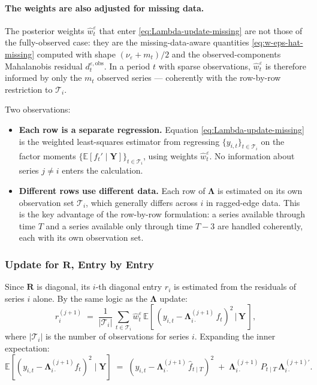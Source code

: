 \documentclass[11pt, a4paper, oneside]{article}
\newcommand{\mL}{\boldsymbol{\Lambda}}
\begin{document}
\paragraph{The weights are also adjusted for missing data.}
The posterior weights $\hat{w}^\varepsilon_t$ that enter
\eqref{eq:Lambda-update-missing} are not those of the fully-observed
case: they are the missing-data-aware quantities
\eqref{eq:w-eps-hat-missing} computed with shape $(\nu_\varepsilon + m_t)/2$
and the observed-components Mahalanobis residual
$d^{\varepsilon, \mathrm{obs}}_t$. In a period $t$ with sparse
observations, $\hat{w}^\varepsilon_t$ is therefore informed by only
the $m_t$ observed series — coherently with the row-by-row
restriction to $\mathcal{T}_i$.

Two observations:
\begin{itemize}[leftmargin=1.5em, itemsep=3pt]
    \item \textbf{Each row is a separate regression.} Equation
          \eqref{eq:Lambda-update-missing} is the weighted least-squares
          estimator from regressing $\{y_{i,t}\}_{t \in \mathcal{T}_i}$ on the
          factor moments $\{\mathbb{E}[f_t' \mid \mathbf{Y}]\}_{t \in \mathcal{T}_i}$,
          using weights $\hat{w}^\varepsilon_t$. No information about
          series $j \neq i$ enters the calculation.
    \item \textbf{Different rows use different data.} Each row of
          $\mL$ is estimated on its own observation set
          $\mathcal{T}_i$, which generally differs across $i$ in ragged-edge
          data. This is the key advantage of the row-by-row formulation:
          a series available through time $T$ and a series available
          only through time $T - 3$ are handled coherently, each with
          its own observation set.
\end{itemize}

\subsubsection{Update for \texorpdfstring{$\mathbf{R}$}{R}, Entry by Entry}

Since $\mathbf{R}$ is diagonal, its $i$-th diagonal entry $r_i$ is
estimated from the residuals of series $i$ alone. By the same logic
as the $\mL$ update:
\begin{equation}
\boxed{\;\;
r_i^{(j+1)} \;=\; \frac{1}{|\mathcal{T}_i|}\, \sum_{t \in \mathcal{T}_i} \hat{w}^\varepsilon_t\, \mathbb{E}\!\left[\,(y_{i,t} - \mL^{(j+1)}_{i \cdot}\, f_t)^2 \,\big|\, \mathbf{Y}\,\right],
\;\;}
\label{eq:R-update-missing}
\end{equation}
where $|\mathcal{T}_i|$ is the number of observations for series $i$.
Expanding the inner expectation:
\[
\mathbb{E}[(y_{i,t} - \mL^{(j+1)}_{i \cdot} f_t)^2 \mid \mathbf{Y}]
\;=\; (y_{i,t} - \mL^{(j+1)}_{i \cdot}\, \hat{f}_{t \mid T})^2 \;+\; \mL^{(j+1)}_{i \cdot}\, P_{t \mid T}\, \mL^{(j+1)\prime}_{i \cdot}.
\]
\end{document}
